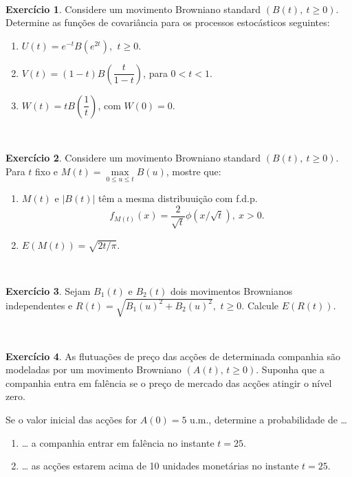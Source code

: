 \documentclass[
  11pt,
  a4paper,
]{book}
\theoremstyle{definition}
\theoremstyle{definition}
\theoremstyle{definition}
\newtheorem{exercise}{Exercício}[chapter]
\theoremstyle{definition}
\theoremstyle{remark}
\begin{document}
\(\,\)

\begin{exercise}
\leavevmode

Considere um movimento Browniano standard \((B(t), ~t\geq 0)\). Determine as funções de covariância para os processos estocásticos seguintes:

\begin{enumerate}
\def\labelenumi{(\alph{enumi})}
\item
  \(U(t)=e^{-t}B(e^{2t})\), \(~t\geq 0\).
\item
  \(V(t)=(1-t)B\left(\dfrac{t}{1-t}\right)\), para \(0<t<1\).
\item
  \(W(t)=tB\left(\dfrac{1}{t}\right)\), com \(W(0)=0\).
\end{enumerate}

\end{exercise}

\(\,\)

\begin{exercise}
\leavevmode

Considere um movimento Browniano standard \((B(t), ~t \geq 0)\). Para \(t\) fixo e \(M(t)=\max\limits_{0\leq u\leq t}B(u)\), mostre que:

\begin{enumerate}
\def\labelenumi{(\alph{enumi})}
\item
  \(M(t)\) e \(\left| B(t)\right|\) têm a mesma distribuuição com f.d.p.
  \[
  f_{M(t)}(x)=\frac{2}{\sqrt{t}}\phi (x/\sqrt{t}),  ~ x>0.
  \]
\item
  \(E(M(t))=\sqrt{2t/\pi }\).
\end{enumerate}

\end{exercise}

\(\,\)

\begin{exercise}
\leavevmode

Sejam \(B_{1}(t)\) e \(B_{2}(t)\) dois movimentos Brownianos independentes e \(R(t)=\sqrt{B_{1}(u)^{2}+B_{2}(u)^{2}},\) \(t\geq 0\). Calcule \(E(R(t)).\)

\end{exercise}

\(\,\)

\begin{exercise}
\leavevmode

As flutuações de preço das acções de determinada companhia são modeladas por um movimento Browniano \((A(t),\, t \geq 0)\). Suponha que a companhia entra em falência se o preço de mercado das acções atingir o nível zero.

Se o valor inicial das acções for \(A(0) = 5\) u.m., determine a probabilidade de \ldots{}

\begin{enumerate}
\def\labelenumi{(\alph{enumi})}
\item
  \ldots{} a companhia entrar em falência no instante \(t = 25\).
\item
  \ldots{} as acções estarem acima de 10 unidades monetárias no instante \(t = 25\).
\end{enumerate}

\end{exercise}
\end{document}
